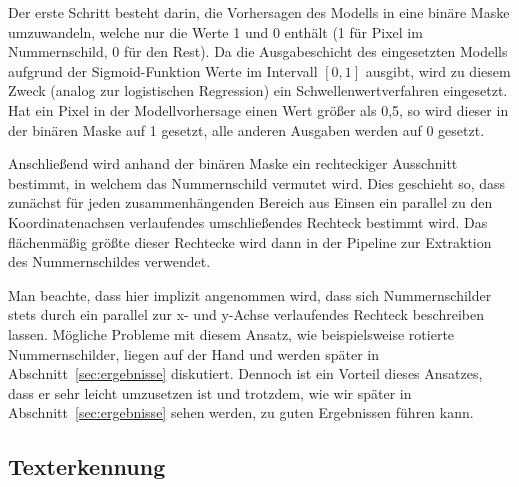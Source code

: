 Der erste Schritt besteht darin, die Vorhersagen des Modells in eine
bin\"are Maske umzuwandeln, welche nur die Werte 1 und 0 enth\"alt
(1 f\"ur Pixel im Nummernschild, 0 f\"ur den Rest).
Da die Ausgabeschicht des eingesetzten Modells aufgrund der
Sigmoid-Funktion Werte im Intervall $[0, 1]$ ausgibt, wird
zu diesem Zweck (analog zur logistischen Regression)
ein Schwellenwertverfahren eingesetzt.
Hat ein Pixel in der Modellvorhersage einen Wert gr\"o{\ss}er als
0,5, so wird dieser in der bin\"aren Maske auf 1 gesetzt, alle
anderen Ausgaben werden auf 0 gesetzt.

Anschlie{\ss}end wird anhand der bin\"aren Maske ein rechteckiger
Ausschnitt bestimmt, in welchem das Nummernschild vermutet wird.
Dies geschieht so, dass zun\"achst f\"ur jeden zusammenh\"angenden
Bereich aus Einsen ein parallel zu den Koordinatenachsen
verlaufendes umschlie{\ss}endes Rechteck bestimmt wird.
Das fl\"achenm\"a{\ss}ig gr\"o{\ss}te dieser Rechtecke wird dann in
der Pipeline zur Extraktion des Nummernschildes verwendet.

Man beachte, dass hier implizit angenommen wird, dass sich
Nummernschilder stets durch ein parallel zur x- und y-Achse
verlaufendes Rechteck beschreiben lassen.
M\"ogliche Probleme mit diesem Ansatz, wie beispielsweise
rotierte Nummernschilder, liegen auf der Hand und werden sp\"ater
in Abschnitt~\ref{sec:ergebnisse} diskutiert.
Dennoch ist ein Vorteil dieses Ansatzes, dass er sehr leicht
umzusetzen ist und trotzdem, wie wir sp\"ater in
Abschnitt~\ref{sec:ergebnisse} sehen werden, zu guten Ergebnissen
f\"uhren kann.

\subsection{Texterkennung}
\label{sec:texterkennung}